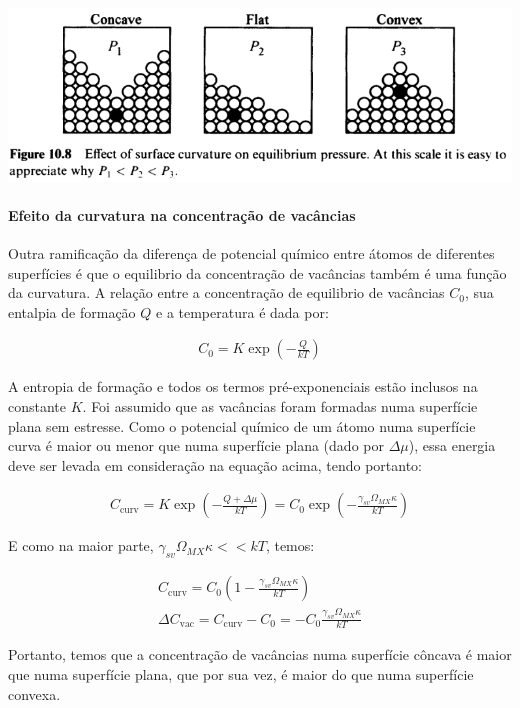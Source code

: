 \includegraphics*[width=\linewidth]{./images/efeito_superficie_pressao_equilibrio.png}

\paragraph*{Efeito da curvatura na concentração de vacâncias}

Outra ramificação da diferença de potencial químico entre átomos de diferentes superfícies é que o equilibrio da concentração de vacâncias também é uma função da curvatura. A relação entre a concentração de equilibrio de vacâncias $C_0$, sua entalpia de formação $Q$ e a temperatura é dada por:

\begin{gather}
    C_0 = K \exp \left( - \frac{Q}{kT} \right)
\end{gather}

A entropia de formação e todos os termos pré-exponenciais estão inclusos na constante $K$. Foi assumido que as vacâncias foram formadas numa superfície plana sem estresse. Como o potencial químico de um átomo numa superfície curva é maior ou menor que numa superfície plana (dado por $\Delta\mu$), essa energia deve ser levada em consideração na equação acima, tendo portanto:

\begin{gather}
    C_{\text{curv}} = K \exp \left( - \frac{Q + \Delta\mu}{kT} \right) = C_0 \exp \left( - \frac{\gamma_{sv} \Omega_{MX} \kappa}{ k T} \right)
\end{gather}

E como na maior parte, $\gamma_{sv} \Omega_{MX} \kappa << kT$, temos:

\begin{gather}
    C_{\text{curv}} = C_0 \left( 1 - \frac{\gamma_{sv} \Omega_{MX} \kappa}{ k T} \right) \\
    \Delta C_{\text{vac}} = C_{\text{curv}} - C_0 = -C_0 \frac{\gamma_{sv} \Omega_{MX} \kappa}{ k T}
\end{gather}

Portanto, temos que a concentração de vacâncias numa superfície côncava é maior que numa superfície plana, que por sua vez, é maior do que numa superfície convexa.

